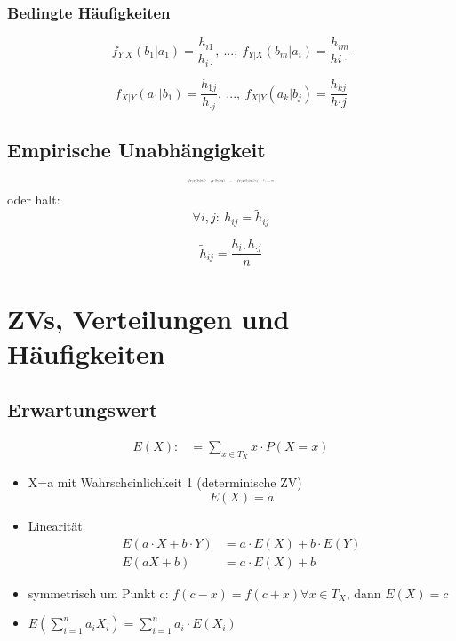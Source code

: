 \documentclass[10pt,a4paper,landscape]{article}
\begin{document}
\begin{multicols}{4}
\subsubsection*{Bedingte Häufigkeiten}

\[
f_{Y|X}(b_1|a_1)=\frac{h_{i1}}{h_{i\cdot}},~...,~ f_{Y|X}(b_m|a_i)=\frac{h_{im}}{h{i\cdot}}
\]

\[
f_{X|Y}(a_1|b_1)=\frac{h_{1j}}{h_{\cdot j}},~...,~ f_{X|Y}(a_k|b_j)=\frac{h_{kj}}{h{\cdot j}}
\]

\subsection{Empirische Unabhängigkeit}
\[ \resizebox{0.2\textwidth}{!}{$
f_{Y|X}(b_j|a_1)=f_Y(b_j|a_2)=...=f_{Y|X}(b_j|a_k)\forall j=1,...,m
$}
\]
oder halt:
\[
\forall i,j: ~ h_{ij}=\tilde{h}_{ij}
\]

\[
\tilde{h}_{ij}=\frac{h_{i \cdot} h_{\cdot j}}{n}
\]


\section{ZVs, Verteilungen und Häufigkeiten}

\subsection{Erwartungswert}
\begin{align*}
E(X) :&=\sum_{x\in T_X} x\cdot P(X=x)
\end{align*}

\begin{itemize}
\item X=a mit Wahrscheinlichkeit 1 (determinische ZV)
\[
E(X)=a
\]
\item Linearität
\begin{align*}
E(a\cdot X + b \cdot Y) &= a\cdot E(X) + b \cdot	E(Y) \\
E(aX+b) &= a\cdot E(X) + b
\end{align*}
\item symmetrisch um Punkt c: $f(c-x)=f(c+x) \forall x \in T_X$, dann $E(X)=c$
\item $E\left(\sum_{i=1}^na_iX_i\right)=\sum_{i=1}^na_i \cdot E(X_i)$
\end{itemize}


\end{multicols}
\end{document}
